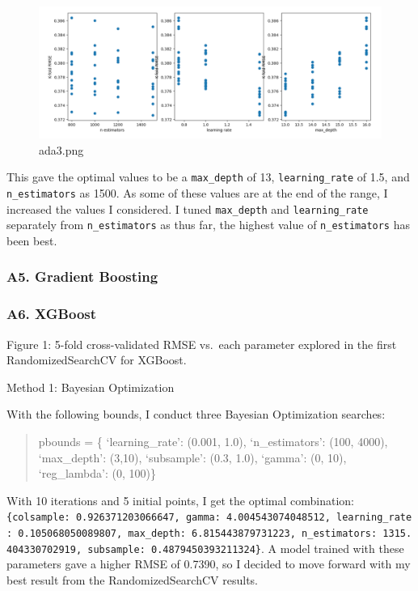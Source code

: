 \documentclass[
  letterpaper,
  DIV=11,
  numbers=noendperiod]{scrartcl}
\begin{document}
\begin{figure}

{\centering \includegraphics{Project_Report_Saturn_files/figure-pdf/ada3.png}

}

\caption{ada3.png}

\end{figure}

This gave the optimal values to be a \texttt{max\_depth} of 13,
\texttt{learning\_rate} of 1.5, and \texttt{n\_estimators} as 1500. As
some of these values are at the end of the range, I increased the values
I considered. I tuned \texttt{max\_depth} and \texttt{learning\_rate}
separately from \texttt{n\_estimators} as thus far, the highest value of
\texttt{n\_estimators} has been best.

\hypertarget{a5.-gradient-boosting}{%
\subsubsection{A5. Gradient Boosting}\label{a5.-gradient-boosting}}

\hypertarget{a6.-xgboost}{%
\subsubsection{A6. XGBoost}\label{a6.-xgboost}}

Figure 1: 5-fold cross-validated RMSE vs.~each parameter explored in the
first RandomizedSearchCV for XGBoost.

Method 1: Bayesian Optimization

With the following bounds, I conduct three Bayesian Optimization
searches:

\begin{quote}
pbounds = \{ `learning\_rate': (0.001, 1.0), `n\_estimators': (100,
4000), `max\_depth': (3,10), `subsample': (0.3, 1.0), `gamma': (0, 10),
`reg\_lambda': (0, 100)\}
\end{quote}

With 10 iterations and 5 initial points, I get the optimal combination:
\texttt{\{\textquotesingle{}colsample\textquotesingle{}:\ 0.926371203066647,\ \textquotesingle{}gamma\textquotesingle{}:\ 4.004543074048512,\ \textquotesingle{}learning\_rate\textquotesingle{}:\ 0.105068050089807,\ \textquotesingle{}max\_depth\textquotesingle{}:\ 6.815443879731223,\ \textquotesingle{}n\_estimators\textquotesingle{}:\ 1315.404330702919,\ \textquotesingle{}subsample\textquotesingle{}:\ 0.4879450393211324\}}.
A model trained with these parameters gave a higher RMSE of 0.7390, so I
decided to move forward with my best result from the RandomizedSearchCV
results.
\end{document}
